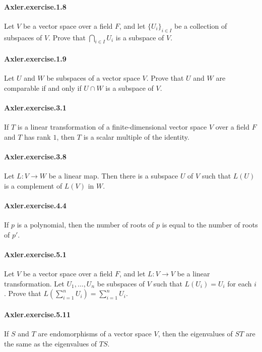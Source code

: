 \documentclass{article}
\begin{document}
\paragraph{Axler.exercise.1.8} Let $V$ be a vector space over a field $F$, and let $\{U_i\}_{i\in I}$ be a collection of subspaces of $V$. Prove that $\bigcap_{i\in I} U_i$ is a subspace of $V$.

\paragraph{Axler.exercise.1.9} Let $U$ and $W$ be subspaces of a vector space $V$. Prove that $U$ and $W$ are comparable if and only if $U\cap W$ is a subspace of $V$.

\paragraph{Axler.exercise.3.1} If $T$ is a linear transformation of a finite-dimensional vector space $V$ over a field $F$ and $T$ has rank $1$, then $T$ is a scalar multiple of the identity.

\paragraph{Axler.exercise.3.8} Let $L:V\to W$ be a linear map. Then there is a subspace $U$ of $V$ such that $L(U)$ is a complement of $L(V)$ in $W$.

\paragraph{Axler.exercise.4.4} If $p$ is a polynomial, then the number of roots of $p$ is equal to the number of roots of $p'$.

\paragraph{Axler.exercise.5.1} Let $V$ be a vector space over a field $F$, and let $L:V\to V$ be a linear transformation. Let $U_1, \dots, U_n$ be subspaces of $V$ such that $L(U_i)=U_i$ for each $i$. Prove that $L(\sum_{i=1}^n U_i)=\sum_{i=1}^n U_i$.

\paragraph{Axler.exercise.5.11} If $S$ and $T$ are endomorphisms of a vector space $V$, then the eigenvalues of $ST$ are the same as the eigenvalues of $TS$.
\end{document}
